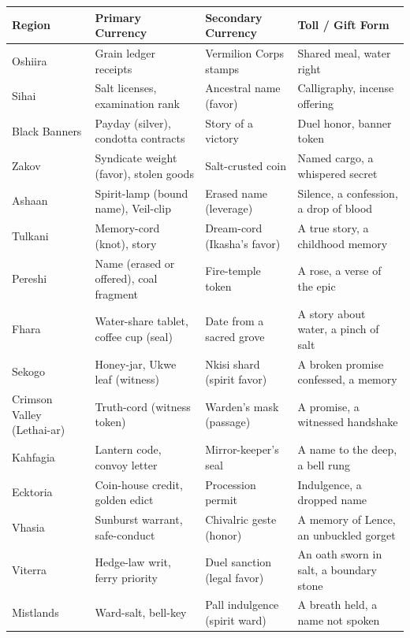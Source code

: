 \documentclass[11pt,letterpaper,twoside]{book}
\begin{document}
\begingroup
\small
\setlength{\tabcolsep}{4pt}
\begin{longtable}{|p{}|p{}|p{}|p{}|}
\hline
\textbf{Region} & \textbf{Primary Currency} & \textbf{Secondary Currency} & \textbf{Toll / Gift Form} \\
\hline
Oshiira & Grain ledger receipts & Vermilion Corps stamps & Shared meal, water right \\
\hline
Sihai & Salt licenses, examination rank & Ancestral name (favor) & Calligraphy, incense offering \\
\hline
Black Banners & Payday (silver), condotta contracts & Story of a victory & Duel honor, banner token \\
\hline
Zakov & Syndicate weight (favor), stolen goods & Salt-crusted coin & Named cargo, a whispered secret \\
\hline
Ashaan & Spirit-lamp (bound name), Veil-clip & Erased name (leverage) & Silence, a confession, a drop of blood \\
\hline
Tulkani & Memory-cord (knot), story & Dream-cord (Ikasha's favor) & A true story, a childhood memory \\
\hline
Pereshi & Name (erased or offered), coal fragment & Fire-temple token & A rose, a verse of the epic \\
\hline
Fhara & Water-share tablet, coffee cup (seal) & Date from a sacred grove & A story about water, a pinch of salt \\
\hline
Sekogo & Honey-jar, Ukwe leaf (witness) & Nkisi shard (spirit favor) & A broken promise confessed, a memory \\
\hline
Crimson Valley (Lethai-ar) & Truth-cord (witness token) & Warden's mask (passage) & A promise, a witnessed handshake \\
\hline
Kahfagia & Lantern code, convoy letter & Mirror-keeper's seal & A name to the deep, a bell rung \\
\hline
Ecktoria & Coin-house credit, golden edict & Procession permit & Indulgence, a dropped name \\
\hline
Vhasia & Sunburst warrant, safe-conduct & Chivalric geste (honor) & A memory of Lence, an unbuckled gorget \\
\hline
Viterra & Hedge-law writ, ferry priority & Duel sanction (legal favor) & An oath sworn in salt, a boundary stone \\
\hline
Mistlands & Ward-salt, bell-key & Pall indulgence (spirit ward) & A breath held, a name not spoken \\

\end{longtable}
\end{document}
